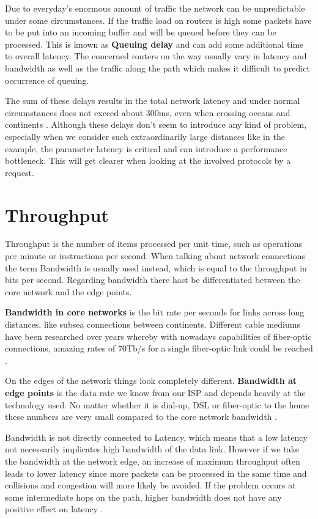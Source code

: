 Due to everyday's enormous amount of traffic the network can be unpredictable under some circumstances. If the traffic load on routers is high some packets have to be put into an incoming buffer and will be queued before they can be processed. This is known as \textbf{Queuing delay} and can add some additional time to overall latency. The concerned routers on the way usually vary in latency and bandwidth as well as the traffic along the path which makes it difficult to predict occurrence of queuing.   

The sum of these delays results in the total network latency and under normal circumstances does not exceed about 300ms, even when crossing oceans and continents \cite{Grigorik_2013}. Although these delays don't seem to introduce any kind of problem, especially when we consider such extraordinarily large distances like in the example, the parameter latency is critical and can introduce a performance bottleneck. This will get clearer when looking at the involved protocols by a request.

\section{Throughput}
Throughput is the number of items processed per unit time, such as operations per minute or instructions per second. When talking about network connections the term Bandwidth is usually used instead, which is equal to the throughput in bits per second. 
Regarding bandwidth there hast be differentiated between the core network and the edge points. 

\textbf{Bandwidth in core networks} is the bit rate per seconds for links across long distances, like subsea connections between continents. Different cable mediums have been researched over years whereby with nowadays capabilities of fiber-optic connections, amazing rates of 70Tb/s for a single fiber-optic link could be reached \cite{Grigorik_2013}. 

On the edges of the network things look completely different. \textbf{Bandwidth at edge points} is the data rate we know from our ISP and depends heavily at the technology used. No matter whether it is dial-up, DSL or fiber-optic to the home these numbers are very small compared to the core network bandwidth  \cite{Grigorik_2013}.

Bandwidth is not directly connected to Latency, which means that a low latency not necessarily implicates high bandwidth of the data link. However if we take the bandwidth at the network edge, an increase of maximum throughput often leads to lower latency since more packets can be processed in the same time and collisions and congestion will more likely be avoided. If the problem occurs at some intermediate hops on the path, higher bandwidth does not have any positive effect on latency \cite{Killelea_2002}.

